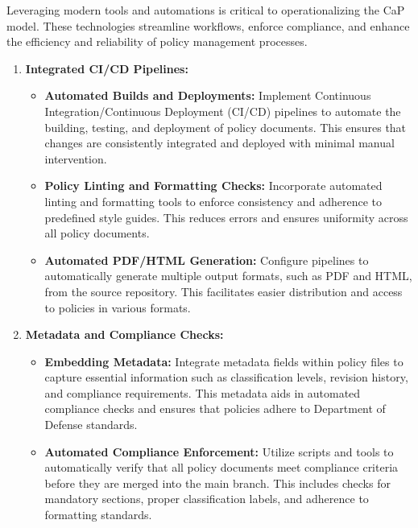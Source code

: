 \documentclass[11pt]{article}
\begin{document}
Leveraging modern tools and automations is critical to operationalizing the CaP model. These technologies streamline workflows, enforce compliance, and enhance the efficiency and reliability of policy management processes.

\begin{enumerate}
    \item \textbf{Integrated CI/CD Pipelines:}
    \begin{itemize}
        \item \textbf{Automated Builds and Deployments:} Implement Continuous Integration/Continuous Deployment (CI/CD) pipelines to automate the building, testing, and deployment of policy documents. This ensures that changes are consistently integrated and deployed with minimal manual intervention.
        \item \textbf{Policy Linting and Formatting Checks:} Incorporate automated linting and formatting tools to enforce consistency and adherence to predefined style guides. This reduces errors and ensures uniformity across all policy documents.
        \item \textbf{Automated PDF/HTML Generation:} Configure pipelines to automatically generate multiple output formats, such as PDF and HTML, from the source repository. This facilitates easier distribution and access to policies in various formats.
    \end{itemize}

    \item \textbf{Metadata and Compliance Checks:}
    \begin{itemize}
        \item \textbf{Embedding Metadata:} Integrate metadata fields within policy files to capture essential information such as classification levels, revision history, and compliance requirements. This metadata aids in automated compliance checks and ensures that policies adhere to Department of Defense standards.
        \item \textbf{Automated Compliance Enforcement:} Utilize scripts and tools to automatically verify that all policy documents meet compliance criteria before they are merged into the main branch. This includes checks for mandatory sections, proper classification labels, and adherence to formatting standards.
    \end{itemize}


\end{enumerate}
\end{document}
